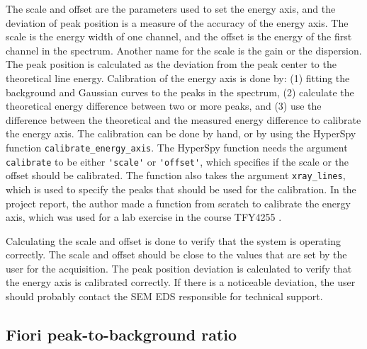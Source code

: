 The scale and offset are the parameters used to set the energy axis, and the deviation of peak position is a measure of the accuracy of the energy axis.
The scale is the energy width of one channel, and the offset is the energy of the first channel in the spectrum.
Another name for the scale is the gain or the dispersion.
The peak position is calculated as the deviation from the peak center to the theoretical line energy.
Calibration of the energy axis is done by: (1) fitting the background and Gaussian curves to the peaks in the spectrum, (2) calculate the theoretical energy difference between two or more peaks, and (3) use the difference between the theoretical and the measured energy difference to calibrate the energy axis.
The calibration can be done by hand, or by using the HyperSpy function \verb|calibrate_energy_axis|.
The HyperSpy function needs the argument \verb|calibrate| to be either \verb|'scale'| or \verb|'offset'|, which specifies if the scale or the offset should be calibrated.
The function also takes the argument \verb|xray_lines|, which is used to specify the peaks that should be used for the calibration.
In the project report, the author made a function from scratch to calibrate the energy axis, which was used for a lab exercise in the course TFY4255 \cite{project_report}.


Calculating the scale and offset is done to verify that the system is operating correctly.
The scale and offset should be close to the values that are set by the user for the acquisition.
The peak position deviation is calculated to verify that the energy axis is calibrated correctly.
If there is a noticeable deviation, the user should probably contact the SEM EDS responsible for technical support.






\subsection{Fiori peak-to-background ratio}
\label{theory:eds_performance:fiori}



